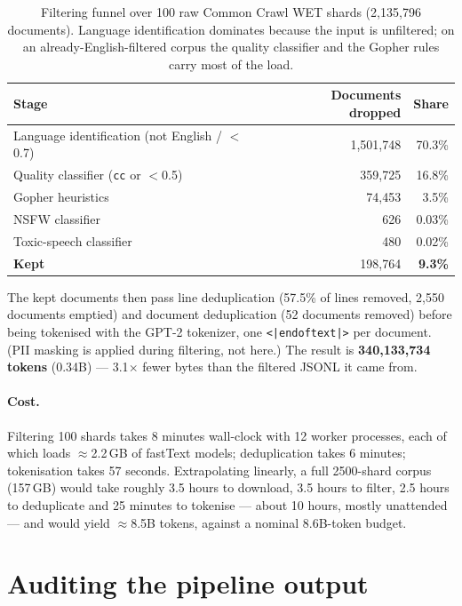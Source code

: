 \documentclass{article}
\begin{document}
\begin{table}[t]
\caption{Filtering funnel over 100 raw Common Crawl WET shards (2{,}135{,}796 documents).
Language identification dominates because the input is unfiltered; on an
already-English-filtered corpus the quality classifier and the Gopher rules carry most of the
load.}
\label{tab:funnel}
\centering
\begin{tabular}{lrr}
\toprule
Stage & Documents dropped & Share \\
\midrule
Language identification (not English / $<$0.7) & 1{,}501{,}748 & 70.3\% \\
Quality classifier (\texttt{cc} or $<$0.5)      & 359{,}725   & 16.8\% \\
Gopher heuristics                             & 74{,}453    & 3.5\% \\
NSFW classifier                               & 626         & 0.03\% \\
Toxic-speech classifier                       & 480         & 0.02\% \\
\midrule
\textbf{Kept}                                 & 198{,}764   & \textbf{9.3\%} \\
\bottomrule
\end{tabular}
\end{table}

The kept documents then pass line deduplication (57.5\% of lines removed, 2{,}550 documents
emptied) and document deduplication (52 documents removed) before being tokenised with the
GPT-2 tokenizer, one \texttt{<|endoftext|>} per document. (PII masking is applied during
filtering, not here.) The result is \textbf{340{,}133{,}734 tokens} (0.34B) --- 3.1$\times$
fewer bytes than the filtered JSONL it came from.

\paragraph{Cost.}
Filtering 100 shards takes 8 minutes wall-clock with 12 worker processes, each of which loads
$\approx$2.2\,GB of fastText models; deduplication takes 6 minutes; tokenisation takes
57 seconds. Extrapolating linearly, a full 2500-shard corpus (157\,GB) would take roughly 3.5
hours to download, 3.5 hours to filter, 2.5 hours to deduplicate and 25 minutes to tokenise ---
about 10 hours, mostly unattended --- and would yield $\approx$8.5B tokens, against a nominal
8.6B-token budget.

\section{Auditing the pipeline output}
\label{sec:audit}
\end{document}
